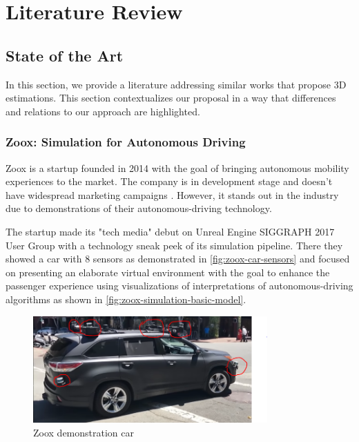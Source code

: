 

\chapter{Literature Review}\label{literature_review}

\section{State of the Art}

    In this section, we provide a literature addressing similar works that propose 3D estimations. This section contextualizes our proposal in a way that differences and relations to our approach are highlighted.

\subsection{Zoox: Simulation for Autonomous Driving}

    Zoox is a startup founded in 2014 with the goal of bringing autonomous mobility experiences to the market. The company is in development stage \cite{zoox-linkedin} and doesn't have widespread marketing campaigns \cite{zoox-official-website}. However, it stands out in the industry due to demonstrations of their autonomous-driving technology. 
    
    The startup made its "tech media" debut on Unreal Engine SIGGRAPH 2017 User Group \cite{zoox-unreal-siggraph-2017} with a technology sneak peek of its simulation pipeline. There they showed a car with 8 sensors as demonstrated in \autoref{fig:zoox-car-sensors} and focused on presenting an elaborate virtual environment with the goal to enhance the passenger experience using visualizations of interpretations of autonomous-driving algorithms as shown in \autoref{fig:zoox-simulation-basic-model}.
    
    \begin{figure}[H]
     \caption{\label{fig:zoox-car-sensors}
Zoox demonstration car}
     \begin{center}
        \includegraphics[width=0.8\textwidth]{images/zoox-car_red-lines.PNG}
     \end{center}
    \end{figure}
    
